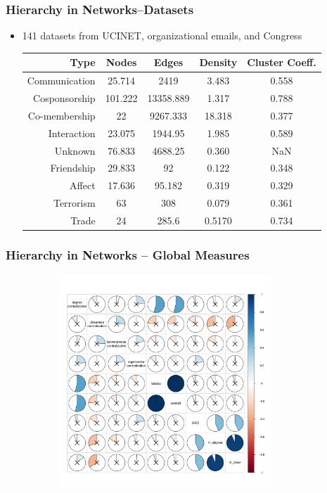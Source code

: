 \documentclass{beamer}
\newenvironment{changemargin}[2]{%
	\begin{list}{}{%
			\setlength{\topsep}{0pt}%
			\setlength{\leftmargin}{#1}%
			\setlength{\rightmargin}{#2}%
			\setlength{\listparindent}{\parindent}%
			\setlength{\itemindent}{\parindent}%
			\setlength{\parsep}{\parskip}%
		}%
		\item[]}{\end{list}}
\begin{document}
\begin{frame}\frametitle{Hierarchy in Networks--Datasets}
	\begin{itemize}
		\item 141 datasets from UCINET, organizational emails, and Congress
		\vspace{.2in}
		\scriptsize
		\begin{table}
			\begin{tabular}{| r || c | c | c | c |}
				\hline
				Type & Nodes & Edges & Density & Cluster Coeff. \\
				\hline
				Communication & 25.714  &2419  &3.483 &  0.558 \\
				Cosponsorship &101.222 &13358.889  &1.317  & 0.788\\
				Co-membership & 22  &9267.333 &18.318  & 0.377\\
				Interaction & 23.075 & 1944.95 & 1.985   &  0.589\\
				Unknown & 76.833 & 4688.25 & 0.360   &  	NaN\\
				Friendship & 29.833  &  92 & 0.122    &  0.348\\
				Affect & 17.636  &  95.182 & 0.319      &	0.329\\
				Terrorism & 63 &  308 & 0.079    &  0.361\\
				Trade & 24 &  285.6 & 0.5170     &  0.734\\
				\hline
			\end{tabular}
		\end{table}
	\end{itemize}
\end{frame}


\begin{frame}\frametitle{Hierarchy in Networks -- Global Measures}
\begin{changemargin}{-2cm}{ -2cm}
	\centering
	\includegraphics[width=12cm, height=8cm]{images/Global_Measure_Correlations_with_Tests.pdf}
\end{changemargin}
\end{frame}
\end{document}

